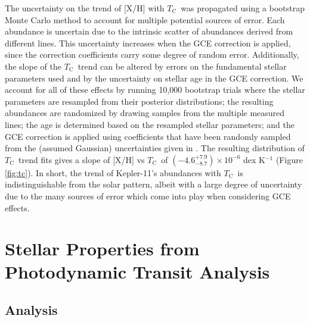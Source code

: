 \documentclass[twocolumn]{aastex61}
\newcommand{\tc}{$T_\mathrm{C}$}
\begin{document}
The uncertainty on the trend of [X/H] with \tc\ was propagated using a bootstrap Monte Carlo method to account for multiple potential sources of error. Each abundance is uncertain due to the intrinsic scatter of abundances derived from different lines. This uncertainty increases when the GCE correction is applied, since the correction coefficients carry some degree of random error. Additionally, the slope of the \tc\ trend can be altered by errors on the fundamental stellar parameters used \citep[as seen in][]{Teske2015} and by the uncertainty on stellar age in the GCE correction. We account for all of these effects by running 10,000 bootstrap trials where the stellar parameters are resampled from their posterior distributions; the resulting abundances are randomized by drawing samples from the multiple measured lines; the age is determined based on the resampled stellar parameters; and the GCE correction is applied using coefficients that have been randomly sampled from the (assumed Gaussian) uncertainties given in \citet{Spina2016b}. The resulting distribution of \tc\ trend fits gives a slope of [X/H] vs \tc\ of $(-4.6^{+7.9}_{-8.7}) \times 10^{-6}$ dex K$^{-1}$ (Figure  \ref{fig:tc}). In short, the trend of Kepler-11's abundances with \tc\ is indistinguishable from the solar pattern, albeit with a large degree of uncertainty due to the many sources of error which come into play when considering GCE effects.





\section{Stellar Properties from Photodynamic Transit Analysis}
\label{s:ttvs}

\subsection{Analysis}
\end{document}
